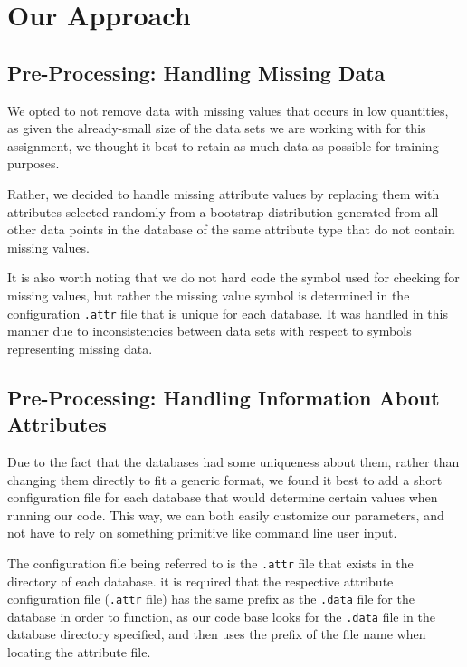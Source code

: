 \documentclass[twoside,11pt]{article}
\begin{document}

\section{Our Approach}

\subsection{Pre-Processing: Handling Missing Data}
 We opted to not remove data with missing values that occurs in low quantities, as given the already-small size of the data sets we are working with for this assignment, we thought it best to retain as much data as possible for training purposes. 

Rather, we decided to handle missing attribute values by replacing them with attributes selected randomly from a bootstrap distribution generated from all other data points in the database of the same attribute type that do not contain missing values. 

It is also worth noting that we do not hard code the symbol used for checking for missing values, but rather the missing value symbol is determined in the configuration \texttt{.attr} file that is unique for each database. It was handled in this manner due to inconsistencies between data sets with respect to symbols representing missing data.

\subsection{Pre-Processing: Handling Information About Attributes}
Due to the fact that the databases had some uniqueness about them, rather than changing them directly to fit a generic format, we found it best to add a short configuration file for each database that would determine certain values when running our code. This way, we can both easily customize our parameters, and not have to rely on something primitive like command line user input. 

The configuration file being referred to is the \texttt{.attr} file that exists in the directory of each database. it is required that the respective attribute configuration file (\texttt{.attr} file) has the same prefix as the \texttt{.data} file for the database in order to function, as our code base looks for the \texttt{.data} file in the database directory specified, and then uses the prefix of the file name when locating the attribute file. 
\end{document}

